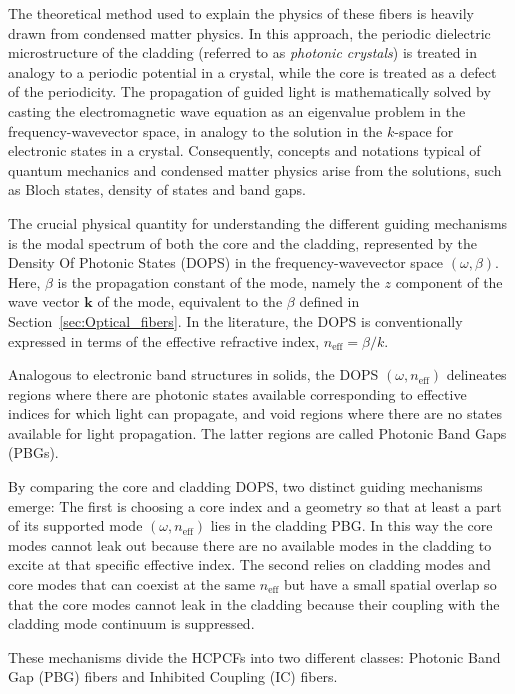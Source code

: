 The theoretical method used to explain the physics of these fibers is heavily drawn from condensed matter physics. In this approach, the periodic dielectric microstructure of the cladding (referred to as \textit{photonic crystals}) is treated in analogy to a periodic potential in a crystal, while the core is treated as a defect of the periodicity. The propagation of guided light is mathematically solved by casting the electromagnetic wave equation as an eigenvalue problem in the frequency-wavevector space, in analogy to the solution in the $k$-space for electronic states in a crystal. Consequently, concepts and notations typical of quantum mechanics and condensed matter physics arise from the solutions, such as Bloch states, density of states and band gaps.

The crucial physical quantity for understanding the different guiding mechanisms is the modal spectrum of both the core and the cladding, represented by the Density Of Photonic States (DOPS) in the frequency-wavevector space $(\omega, \beta)$. Here, $\beta$ is the propagation constant of the mode, namely the $z$ component of the wave vector $\mathbf{k}$ of the mode, equivalent to the $\beta$ defined in Section~\ref{sec:Optical_fibers}. In the literature, the DOPS is conventionally expressed in terms of the effective refractive index, $n_\text{eff} = \beta / k$.

Analogous to electronic band structures in solids, the DOPS $(\omega, n_\text{eff})$ delineates regions where there are photonic states available corresponding to effective indices for which light can propagate, and void regions where there are no states available for light propagation. The latter regions are called Photonic Band Gaps (PBGs). 

By comparing the core and cladding DOPS, two distinct guiding mechanisms emerge:
The first is choosing a core index and a geometry so that at least a part of its supported mode $(\omega, n_\text{eff})$ lies in the cladding PBG. In this way the core modes cannot leak out because there are no available modes in the cladding to excite at that specific effective index. The second relies on cladding modes and core modes that can coexist at the same $n_\text{eff}$ but have a small spatial overlap so that the core modes cannot leak in the cladding because their coupling with the cladding mode continuum is suppressed.

These mechanisms divide the HCPCFs into two different classes: Photonic Band Gap (PBG) fibers and Inhibited Coupling (IC) fibers.

